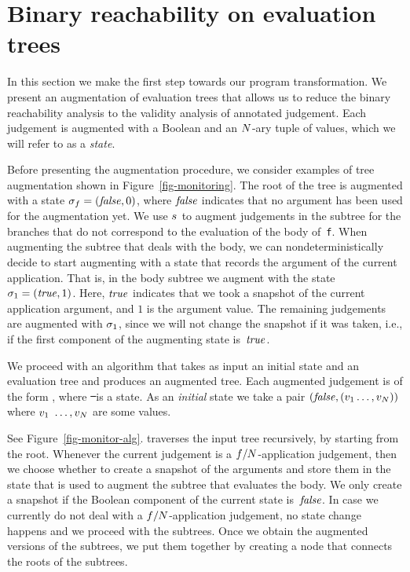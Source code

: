 \section{Binary reachability on evaluation trees}
\label{sec-semantics}

In this section we make the first step towards our program
transformation.
We present an augmentation of evaluation trees that allows us to
reduce the binary reachability analysis to the validity analysis of
annotated judgement.
Each judgement is augmented with a Boolean and an $N$-ary
tuple of values, which we will refer to as a \emph{state}.

 

Before presenting the augmentation procedure, we consider examples of
tree augmentation shown in Figure~\ref{fig-monitoring}.
The root of the tree is augmented with a state $\sigma_{f} = (\mathit{false}, 0)$,
where $\mathit{false}$ indicates that no argument has been used for the
augmentation yet.
We use $s_{}$ to augment judgements in the subtree for the branches
that do not correspond to the evaluation of the body of~\texttt{f}.
When augmenting the subtree that deals with the body, we can
nondeterministically decide to start augmenting with a state that
records the argument of the current application.
That is, in the body subtree we augment with the state $\sigma_{1} =
(\mathit{true}, 1)$.
Here, $\mathit{true}$ indicates that we took a snapshot of the current
application argument, and $1$ is the argument value.
The remaining judgements are augmented with $\sigma_{1}$, since we will
not change the snapshot if it was taken, i.e., if the first component
of the augmenting state is~$\mathit{true}$.

We proceed with an algorithm \monitor that takes as input an initial
state and an evaluation tree and produces an augmented tree.
Each augmented judgement is of the form
\mevj{\evj{\ectx}{\expr}{\val}}{\stupa}{\st}, where \st\ is a state.
As an \emph{initial} state we take a pair $(\mathit{false}, (v_1 \dots,
v_{N}))$ where $v_1\ \dots, v_{N}$ are some values.

See Figure~\ref{fig-monitor-alg}.
\monitor traverses the input tree recursively, by starting from the
root.
Whenever the current judgement is a
$f/N$-application judgement, then we choose whether
to create a snapshot of the arguments and store them in the state that
is used to augment the subtree that evaluates the body.
We only create a snapshot if the Boolean component of the current
state is~$\mathit{false}$.
In case we currently do not deal with a
$f/N$-application judgement, no state change
happens and we proceed with the subtrees.
Once we obtain the augmented versions of the subtrees, we put them
together by creating a node that connects the roots of the subtrees.


